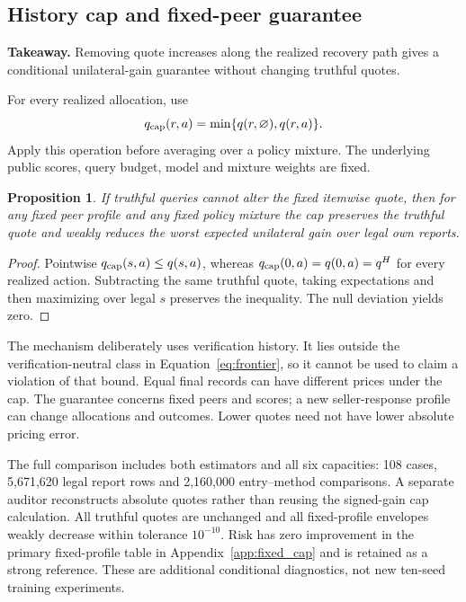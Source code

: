 \documentclass[11pt]{article}
\newtheorem{proposition}{Proposition}
\begin{document}
\subsection{History cap and fixed-peer guarantee}
\noindent\textbf{Takeaway.} Removing quote increases along the realized recovery
path gives a conditional unilateral-gain guarantee without changing truthful quotes.

For every realized allocation, use
\begin{equation*}
 q_{\rm cap}(r,a)=\min\{q(r,\varnothing),q(r,a)\}.
\end{equation*}
Apply this operation before averaging over a policy mixture. The underlying
public scores, query budget, model and mixture weights are fixed.

\begin{proposition}
If truthful queries cannot alter the fixed itemwise quote, then for any fixed
peer profile and any fixed policy mixture the cap preserves the truthful quote
and weakly reduces the worst expected unilateral gain over legal own reports.
\end{proposition}
\begin{proof}
Pointwise $q_{\rm cap}(s,a)\le q(s,a)$, whereas
$q_{\rm cap}(0,a)=q(0,a)=q^H$ for every realized action. Subtracting the same
truthful quote, taking expectations and then maximizing over legal $s$ preserves
the inequality. The null deviation yields zero.\end{proof}

The mechanism deliberately uses verification history. It lies outside the
verification-neutral class in Equation~\eqref{eq:frontier}, so it cannot be used
to claim a violation of that bound. Equal final records can have different
prices under the cap. The guarantee concerns fixed peers and scores; a new
seller-response profile can change allocations and outcomes. Lower quotes need
not have lower absolute pricing error.



The full comparison includes both estimators and all six capacities: 108 cases,
5,671,620 legal report rows and 2,160,000 entry--method comparisons. A separate
auditor reconstructs absolute quotes rather than reusing the signed-gain cap
calculation. All truthful quotes are unchanged and all fixed-profile envelopes
weakly decrease within tolerance $10^{-10}$. Risk has zero improvement in the
primary fixed-profile table in Appendix~\ref{app:fixed_cap} and is retained as a strong reference. These are additional
conditional diagnostics, not new ten-seed training experiments.
\end{document}
